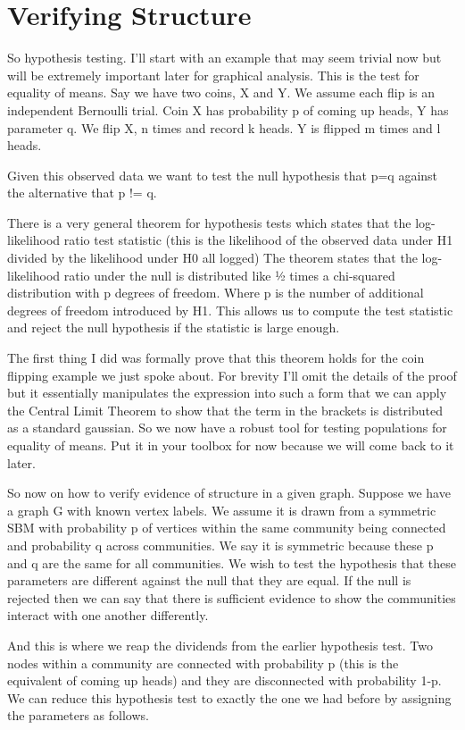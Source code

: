\documentclass[]{article}
\begin{document}
\section{Verifying Structure}

So hypothesis testing. I’ll start with an example that may seem trivial now but will be extremely important later for graphical analysis. This is the test for equality of means. Say we have two coins, X and Y. We assume each flip is an independent Bernoulli trial. Coin X has probability p of coming up heads, Y has parameter q. We flip X, n times and record k heads. Y is flipped m times and l heads.

Given this observed data we want to test the null hypothesis that p=q against the alternative that p != q.

There is a very general theorem for hypothesis tests which states that the log-likelihood ratio test statistic (this is the likelihood of the observed data under H1 divided by the likelihood under H0 all logged) The theorem states that the log-likelihood ratio under the null is distributed like ½ times a chi-squared distribution with p degrees of freedom. Where p is the number of additional degrees of freedom introduced by H1. This allows us to compute the test statistic and reject the null hypothesis if the statistic is large enough.

The first thing I did was formally prove that this theorem holds for the coin flipping example we just spoke about. For brevity I’ll omit the details of the proof but it essentially manipulates the expression into such a form that we can apply the Central Limit Theorem to show that the term in the brackets is distributed as a standard gaussian. So we now have a robust tool for testing populations for equality of means. Put it in your toolbox for now because we will come back to it later.

So now on how to verify evidence of structure in a given graph. Suppose we have a graph G with known vertex labels. We assume it is drawn from a symmetric SBM with probability p of vertices within the same community being connected and probability q across communities. We say it is symmetric because these p and q are the same for all communities. We wish to test the hypothesis that these parameters are different against the null that they are equal. If the null is rejected then we can say that there is sufficient evidence to show the communities interact with one another differently.

And this is where we reap the dividends from the earlier hypothesis test. Two nodes within a community are connected with probability p (this is the equivalent of coming up heads) and they are disconnected with probability 1-p. We can reduce this hypothesis test to exactly the one we had before by assigning the parameters as follows.
\end{document}

